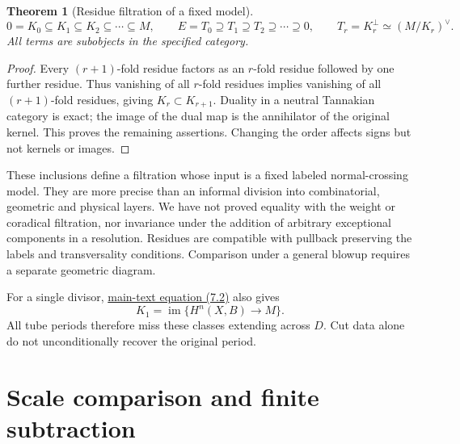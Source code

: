 \documentclass[11pt,a4paper,oneside]{article}
\theoremstyle{plain}
\newtheorem{theorem}{Theorem}[section]
\theoremstyle{definition}
\theoremstyle{remark}
\numberwithin{equation}{section}
\newcommand{\otherref}[2]{\href{#1.pdf}{#2}}
\begin{document}
\begin{theorem}[Residue filtration of a fixed model]\label{thm:cut:3.1}
\begin{equation}
0=K_0\subseteq K_1\subseteq K_2\subseteq\cdots\subseteq M,
 \qquad E=T_0\supseteq T_1\supseteq T_2\supseteq\cdots\supseteq0,
 \qquad T_r=K_r^\perp\simeq(M/K_r)^\vee.              \label{eq:cut:3.4}
\end{equation}
All terms are subobjects in the specified category.
\end{theorem}
\begin{proof}
Every $(r+1)$-fold residue factors as an $r$-fold residue followed by one further residue. Thus vanishing of all $r$-fold residues implies vanishing of all $(r+1)$-fold residues, giving \(K_r\subset K_{r+1}\). Duality in a neutral Tannakian category is exact; the image of the dual map is the annihilator of the original kernel. This proves the remaining assertions. Changing the order affects signs but not kernels or images.
\end{proof}

These inclusions define a filtration whose input is a fixed labeled normal-crossing model. They are more precise than an informal division into combinatorial, geometric and physical layers. We have not proved equality with the weight or coradical filtration, nor invariance under the addition of arbitrary exceptional components in a resolution. Residues are compatible with pullback preserving the labels and transversality conditions. Comparison under a general blowup requires a separate geometric diagram.

For a single divisor, \otherref{feynman_periods_long_paper_en}{main-text equation (7.2)} also gives
\begin{equation}
K_1=\operatorname{im}\{H^n(X,B)\to M\}.              \label{eq:cut:3.5}
\end{equation}
All tube periods therefore miss these classes extending across $D$. Cut data alone do not unconditionally recover the original period.
\endgroup


\section{Scale comparison and finite subtraction}\label{supp:primitive}
\begingroup
\end{document}
